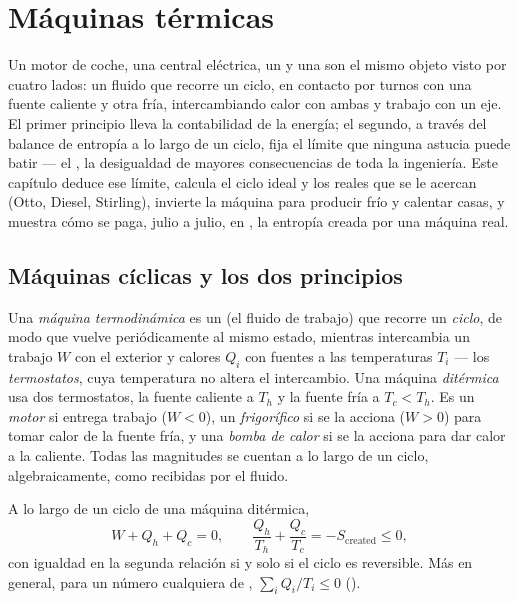 \chapter{Máquinas térmicas}\label{ch:b1:heat-engines}

Un motor de coche, una central eléctrica, un  y una  son el mismo objeto visto por cuatro lados: un fluido que recorre
un ciclo, en contacto por turnos con una fuente caliente y otra fría,
intercambiando calor con ambas y trabajo con un eje. El primer principio
lleva la contabilidad de la energía; el segundo, a través del balance de
entropía a lo largo de un ciclo, fija el límite que ninguna astucia
puede batir --- el , la desigualdad de mayores
consecuencias de toda la ingeniería. Este capítulo deduce ese límite,
calcula el ciclo ideal y los reales que se le acercan (Otto, Diesel,
Stirling), invierte la máquina para producir frío y calentar casas, y
muestra cómo se paga, julio a julio, en , la entropía
creada por una máquina real.

\section{Máquinas cíclicas y los dos principios}

\begin{definition}\label{def:b1:heat-engines:machine}
Una \emph{máquina termodinámica} es un  (el fluido de
trabajo) que recorre un \emph{ciclo}, de modo que vuelve periódicamente al
mismo estado, mientras intercambia un trabajo $W$ con el exterior y
calores $Q_i$ con fuentes a las temperaturas $T_i$ --- los
\emph{termostatos}, cuya temperatura no altera el intercambio. Una máquina
\emph{ditérmica} usa dos termostatos, la fuente caliente a $T_h$ y la
fuente fría a $T_c < T_h$. Es un \emph{motor} si entrega trabajo ($W < 0$),
un \emph{frigorífico} si se la acciona ($W > 0$) para tomar calor de la
fuente fría, y una \emph{bomba de calor} si se la acciona para dar calor a
la caliente. Todas las magnitudes se cuentan a lo largo de un ciclo,
algebraicamente, como recibidas por el fluido.
\end{definition}

\begin{theorem}\label{thm:b1:heat-engines:clausius}
A lo largo de un ciclo de una máquina ditérmica,
\[
W + Q_h + Q_c = 0 , \qquad
\frac{Q_h}{T_h} + \frac{Q_c}{T_c} = -S_{\mathrm{created}} \leq 0 ,
\]
con igualdad en la segunda relación si y solo si el ciclo es reversible.
Más en general, para un número cualquiera de ,
$\sum_i Q_i/T_i \leq 0$ (\emph{}).
\end{theorem}

